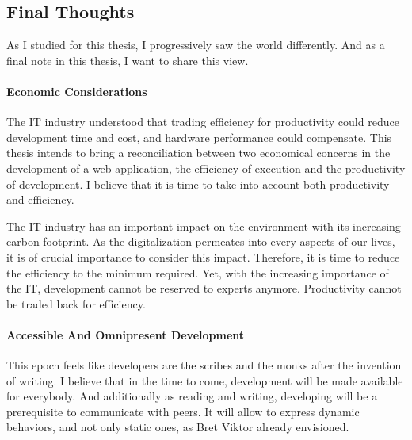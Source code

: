 

\subsection{Final Thoughts}

As I studied for this thesis, I progressively saw the world differently.
And as a final note in this thesis, I want to share this view.

\paragraph{Economic Considerations}

The IT industry understood that trading efficiency for productivity could reduce development time and cost, and hardware performance could compensate.
This thesis intends to bring a reconciliation between two economical concerns in the development of a web application, the efficiency of execution and the productivity of development.
I believe that it is time to take into account both productivity and efficiency.

The IT industry has an important impact on the environment with its increasing carbon footprint.
As the digitalization permeates into every aspects of our lives, it is of crucial importance to consider this impact.
Therefore, it is time to reduce the efficiency to the minimum required.
Yet, with the increasing importance of the IT, development cannot be reserved to experts anymore.
Productivity cannot be traded back for efficiency.


\paragraph{Accessible And Omnipresent Development}

This epoch feels like developers are the scribes and the monks after the invention of writing.
I believe that in the time to come, development will be made available for everybody.
And additionally as reading and writing, developing will be a prerequisite to communicate with peers.
It will allow to express dynamic behaviors, and not only static ones, as Bret Viktor already envisioned.

